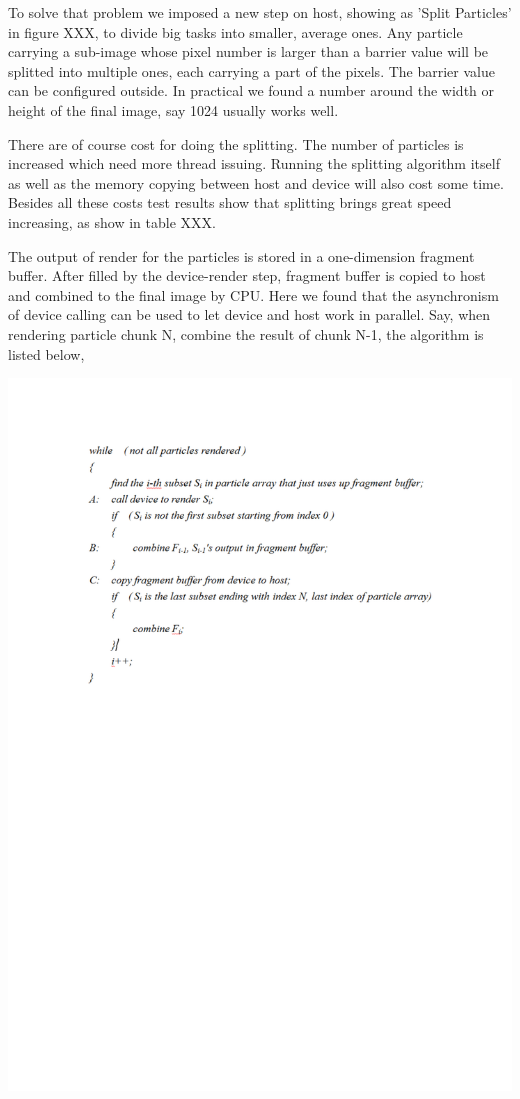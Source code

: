To solve that problem we imposed a new step on host, showing as 'Split Particles' in figure XXX, to divide big tasks into smaller, average ones. Any particle carrying a sub-image whose pixel number is larger than a barrier value will be splitted into multiple ones, each carrying a part of the pixels. The barrier value can be configured outside. In practical we found a number around the width or height of the final image, say 1024 usually works well.

There are of course cost for doing the splitting. The number of particles is increased which need more thread issuing. Running the splitting algorithm itself as well as the memory copying between host and device will also cost some time. Besides all these costs test results show that splitting brings great speed increasing, as show in table XXX.

The output of render for the particles is stored in a one-dimension fragment buffer. After filled by the device-render step, fragment buffer is copied to host and combined to the final image by CPU. Here we found that the asynchronism of device calling can be used to let device and host work in parallel. Say, when rendering particle chunk N, combine the result of chunk N-1, the algorithm is listed below,

\includegraphics[width=1.2\textwidth]{cuda_code.pdf}


